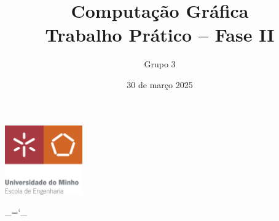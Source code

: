 \documentclass[12pt, a4paper]{article}
\title{\Huge \textbf{Computação Gráfica \\ \Large Trabalho Prático -- Fase II}}
\date{30 de março 2025}
\author{Grupo 3}
\begin{document}
\begin{center}
    \includegraphics[width=0.25\textwidth]{res/cover/EE-C.eps}
\end{center}

\chardef\_=`_
\onehalfspacing
\setlength{\parskip}{\baselineskip}
\setlength{\parindent}{0pt}
\def\arraystretch{1.5}

{\let\newpage\relax\maketitle}
\maketitle
\thispagestyle{empty}

\vspace*{\fill}
\end{document}
